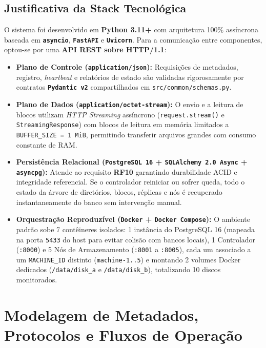 \documentclass[10pt,a4paper]{article}
\begin{document}
\subsection{Justificativa da Stack Tecnológica}
O sistema foi desenvolvido em \textbf{Python 3.11+} com arquitetura 100\% assíncrona baseada em \textbf{\texttt{asyncio}}, \textbf{\texttt{FastAPI}} e \textbf{\texttt{Uvicorn}}. Para a comunicação entre componentes, optou-se por uma \textbf{API REST sobre HTTP/1.1}:
\begin{itemize}
    \item \textbf{Plano de Controle (\texttt{application/json}):} Requisições de metadados, registro, \textit{heartbeat} e relatórios de estado são validadas rigorosamente por contratos \textbf{\texttt{Pydantic v2}} compartilhados em \texttt{src/common/schemas.py}.
    \item \textbf{Plano de Dados (\texttt{application/octet-stream}):} O envio e a leitura de blocos utilizam \textit{HTTP Streaming} assíncrono (\texttt{request.stream()} e \texttt{StreamingResponse}) com blocos de leitura em memória limitados a \texttt{BUFFER\_SIZE = 1 MiB}, permitindo transferir arquivos grandes com consumo constante de RAM.
    \item \textbf{Persistência Relacional (\texttt{PostgreSQL 16} + \texttt{SQLAlchemy 2.0 Async} + \texttt{asyncpg}):} Atende ao requisito \textbf{RF10} garantindo durabilidade ACID e integridade referencial. Se o controlador reiniciar ou sofrer queda, todo o estado da árvore de diretórios, blocos, réplicas e nós é recuperado instantaneamente do banco sem intervenção manual.
    \item \textbf{Orquestração Reproduzível (\texttt{Docker} + \texttt{Docker Compose}):} O ambiente padrão sobe 7 contêineres isolados: 1 instância do PostgreSQL 16 (mapeada na porta \texttt{5433} do host para evitar colisão com bancos locais), 1 Controlador (\texttt{:8000}) e 5 Nós de Armazenamento (\texttt{:8001} a \texttt{:8005}), cada um associado a um \texttt{MACHINE\_ID} distinto (\texttt{machine-1..5}) e montando 2 volumes Docker dedicados (\texttt{/data/disk\_a} e \texttt{/data/disk\_b}), totalizando 10 discos monitorados.
\end{itemize}

\section{Modelagem de Metadados, Protocolos e Fluxos de Operação}
\end{document}

